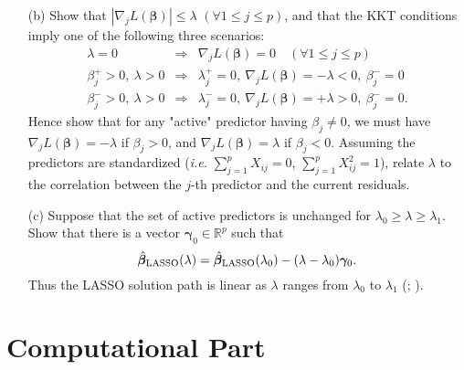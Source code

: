 \documentclass[10pt]{article}
\theoremstyle{definition}
\theoremstyle{remark}
\newcommand{\bbeta}{\bm{\beta}}
\newcommand{\bgamma}{\bm{\gamma}}
\newcommand{\bbR}{\mathbb{R}}
\begin{document}
\begin{enumerate}
\begin{itemize}[leftmargin=*]
		\item [(b)] Show that $ |\nabla_{j}L(\bbeta)| \le \lambda $ $ (\forall 1 \le j \le p) $, and that the KKT conditions imply one of the following three scenarios:
		\[ \begin{array}{rll}
		\lambda = 0 & \Rightarrow & \nabla_{j}L(\bbeta) = 0 \quad(\forall 1 \le j \le p)\\
		\beta_{j}^{+} > 0,\ \lambda > 0 & \Rightarrow & \lambda_{j}^{+} = 0,\ \nabla_{j}L(\bbeta) = -\lambda < 0,\ \beta_{j}^{-} = 0 \\
		\beta_{j}^{-} > 0,\ \lambda > 0 & \Rightarrow & \lambda_{j}^{-} = 0,\ \nabla_{j}L(\bbeta) = +\lambda > 0,\ \beta_{j}^{-} = 0.
		\end{array} \]
		Hence show that for any "active" predictor having $ \beta_{j} \ne 0 $, we must have $ \nabla_{j}L(\bbeta) = -\lambda $ if $ \beta_{j} > 0 $, and $ \nabla_{j}L(\bbeta) = \lambda $ if $ \beta_{j} < 0 $. Assuming the predictors are standardized (\textit{i.e.} $ \sum_{j=1}^{p}X_{ij} = 0 $, $ \sum_{j=1}^{p}X_{ij}^{2} = 1 $), relate $ \lambda $ to the correlation between the $ j $-th predictor and the current residuals.
		
		\item [(c)] Suppose that the set of active predictors is unchanged for $ \lambda_{0} \ge \lambda \ge \lambda_{1} $. Show that there is a vector $ \bgamma_{0} \in \bbR^{p} $ such that
		\[ \hat{\bbeta}_{\rm LASSO}(\lambda) = \hat{\bbeta}_{\rm LASSO}(\lambda_{0}) - (\lambda - \lambda_{0})\bgamma_{0}. \]
		Thus the LASSO solution path is linear as $ \lambda $ ranges from $ \lambda_{0} $ to $ \lambda_{1} $ (\cite[Efron \textit{et al.}, 2004]{efron2004least}; \cite[Rosset and Zhu, 2007]{rosset2007piecewise}).
	\end{itemize}
\end{enumerate}


\newpage 

\section*{Computational Part}
\end{document}
